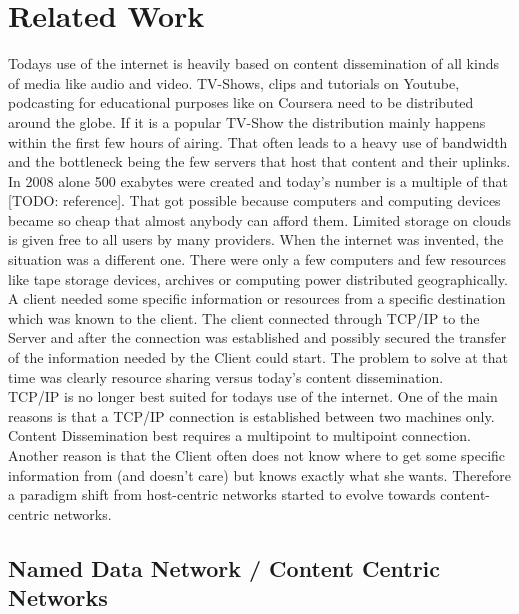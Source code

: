 \chapter{Related Work}

Todays use of the internet is heavily based on content dissemination of all kinds of media like audio and video. TV-Shows, clips and tutorials on Youtube, podcasting for educational purposes like on Coursera need to be distributed around the globe. If it is a popular TV-Show the distribution mainly happens within the first few hours of airing. That often leads to a heavy use of bandwidth and the bottleneck being the few servers that host that content and their uplinks. In 2008 alone 500 exabytes were created and today's number is a multiple of that [TODO: reference]. That got possible because computers and computing devices became so cheap that almost anybody can afford them. Limited storage on clouds is given free to all users by many providers. When the internet was invented, the situation was a different one. There were only a few computers and few resources like tape storage devices, archives or computing power distributed geographically. A client needed some specific information or resources from a specific destination which was known to the client. The client connected through TCP/IP to the Server and after the connection was established and possibly secured the transfer of the information needed by the Client could start. The problem to solve at that time was clearly resource sharing versus today's content dissemination.\\

TCP/IP is no longer best suited for todays use of the internet. One of the main reasons is that a TCP/IP connection is established between two machines only. Content Dissemination best requires a multipoint to multipoint connection. Another reason is that the Client often does not know where to get some specific information from (and doesn't care) but knows exactly what she wants. Therefore a paradigm shift from host-centric networks started to evolve towards content-centric networks.

\section{Named Data Network / Content Centric Networks}

